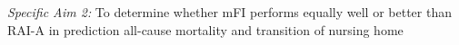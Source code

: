 \emph{Specific Aim 2:} To determine whether mFI performs equally well or better than RAI-A in prediction all-cause mortality and transition of nursing home